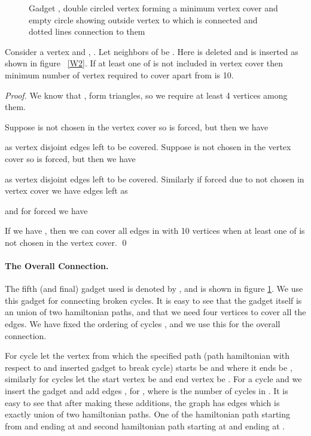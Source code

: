 \documentclass[svgnames]{llncs}
\begin{document}
{\begin{figure}
\caption{Gadget , double circled vertex forming a minimum vertex cover and empty circle showing outside vertex to which  is connected and dotted lines connection to them}
\label{gadgetW_c}
\end{figure}

\begin{lemma}
 Consider a vertex  and , .
 Let neighbors of  be . Here  is deleted and  is inserted as shown in figure ~\ref{W2}.
 If at least one of  is not included in vertex cover then minimum number of vertex required
 to cover  
 apart from  is 10.
 \label{tildwwvc17}
\end{lemma}
\begin{proof}
We know that ,  form triangles, so we require at least 4 vertices among them.


Suppose  is not chosen in the vertex cover so  is forced, but then we have
  
as vertex disjoint edges left to be covered.
Suppose  is not chosen in the vertex cover so  is forced, but then we have

as vertex disjoint edges left to be covered.
Similarly if  forced due to  not chosen in vertex cover we have edges left as

and for  forced we have

If we have
, then we can cover all edges in  with 10 vertices when at least one of  is not chosen in the vertex cover.
\qed
\end{proof}

\paragraph{The Overall Connection.} The fifth (and final) gadget used is denoted by , and is shown in figure \ref{gadgetW_c}. We use this gadget for connecting broken cycles. It is easy to see that the gadget itself is an union of two hamiltonian paths, and that we need four vertices to cover all the edges. We have fixed the ordering of cycles , and we use this for the overall connection.

For cycle  let the vertex from which the specified path (path hamiltonian with respect to  and inserted gadget to break cycle) starts be  and where it ends be ,
similarly for cycles  let the start vertex be  and end vertex be .
For a cycle  and  we insert the gadget  and add edges ,
for , where  is the number of cycles in . It is easy to see that after making these additions, the graph has edges which is exactly union of two hamiltonian paths. One of the hamiltonian path starting from  and ending at  and second hamiltonian path starting at  and ending at .

}
\end{document}
